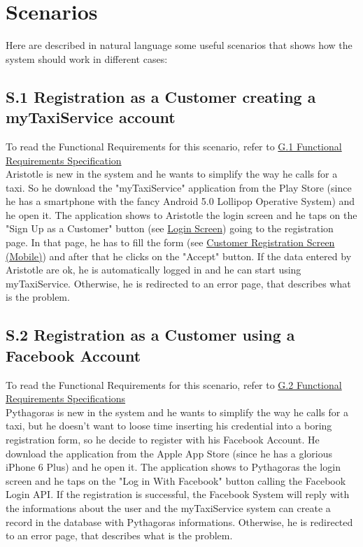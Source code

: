 \section{Scenarios}\label{sec:SectionScenarios}
	Here are described in natural language some useful scenarios that shows how the system should work in different cases:

		\subsection{S.1 Registration as a Customer creating a myTaxiService account}\label{sec:NormalCustomerRegistrationScenario}
		To read the Functional Requirements for this scenario, refer to \hyperref[sec:frs1]{G.1 Functional Requirements Specification}\\

		Aristotle is new in the system and he wants to simplify the way he calls for a taxi. So he download the "myTaxiService" application from the Play Store (since he has a smartphone with the fancy Android 5.0 Lollipop Operative System) and he open it.
		The application shows to Aristotle the login screen and he taps on the "Sign Up as a Customer" button (see \hyperref[login_m]{Login Screen}) going to the registration page. In that page, he has to fill the form (see \hyperref[cregistration_m]{Customer Registration Screen (Mobile)}) and after that he clicks on the "Accept" button. If the data entered by Aristotle are ok, he is automatically logged in and he can start using myTaxiService. Otherwise, he is redirected to an error page, that describes what is the problem. 

		\subsection{S.2 Registration as a Customer using a Facebook Account}\label{sec:FacebookCustomerRegistrationScenario}
		To read the Functional Requirements for this scenario, refer to \hyperref[sec:frs2]{G.2 Functional Requirements Specifications}\\

		Pythagoras is new in the system and he wants to simplify the way he calls for a taxi, but he doesn't want to loose time inserting his credential into a boring registration form, so he decide to register with his Facebook Account.
		He download the application from the Apple App Store (since he has a glorious iPhone 6 Plus) and he open it.
		The application shows to Pythagoras the login screen and he taps on the "Log in With Facebook" button calling the Facebook Login API.
		If the registration is successful, the Facebook System will reply with the informations about the user and the myTaxiService system can create a record in the database with Pythagoras informations. Otherwise, he is redirected to an error page, that describes what is the problem.

